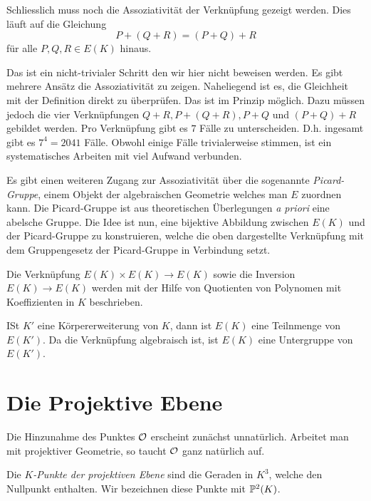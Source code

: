 Schliesslich muss noch die Assoziativität der Verknüpfung gezeigt
werden. Dies läuft auf die Gleichung
$$
P + (Q + R) = (P+Q)+R$$
für alle $P,Q,R\in E(K)$ hinaus.

Das ist ein nicht-trivialer Schritt den wir hier nicht beweisen
werden. Es gibt mehrere Ansätz die Assoziativität zu zeigen.
Naheliegend ist es, die Gleichheit mit der Definition direkt zu
überprüfen. Das ist im Prinzip möglich. Dazu müssen jedoch die vier
Verknüpfungen $Q+R, P+(Q+R), P+Q$ und $(P+Q)+R$ gebildet werden.
Pro Verknüpfung gibt es $7$ Fälle zu unterscheiden. D.h. ingesamt gibt
es $7^4= 2041$ Fälle. Obwohl einige Fälle trivialerweise stimmen, ist
ein systematisches Arbeiten mit viel Aufwand verbunden.


Es gibt einen weiteren Zugang zur Assoziativität über die sogenannte
 \emph{Picard-Gruppe}, einem  Objekt der algebraischen Geometrie
welches man $E$ zuordnen kann. Die Picard-Gruppe ist aus theoretischen
Überlegungen \textit{a priori} eine abelsche Gruppe. Die Idee ist nun, eine
bijektive Abbildung zwischen $E(K)$ und der Picard-Gruppe zu
konstruieren, welche die oben dargestellte Verknüpfung mit dem
Gruppengesetz der Picard-Gruppe in Verbindung setzt.


\begin{bemerkung}
  Die Verknüpfung $E(K)\times
  E(K)\rightarrow E(K)$ sowie die Inversion $E(K)\rightarrow E(K)$
  werden mit der Hilfe von 
  Quotienten von Polynomen mit Koeffizienten in $K$ beschrieben.

  ISt $K'$ eine Körpererweiterung von $K$, dann ist $E(K)$ eine
  Teilnmenge von $E(K')$. Da die Verknüpfung algebraisch ist, ist
  $E(K)$ eine Untergruppe von $E(K')$.
\end{bemerkung}

\section{Die Projektive Ebene}
\label{sec:projektiv}

Die Hinzunahme des Punktes ${\mathcal O}$ erscheint zunächst unnatürlich.
Arbeitet man mit projektiver Geometrie, so taucht ${\mathcal O}$ ganz natürlich
auf.

\begin{definition}
  Die \emph{$K$-Punkte der projektiven Ebene} sind die Geraden in $K^3$,
  welche den Nullpunkt enthalten. Wir bezeichnen diese Punkte mit
  ${\mathbb{P}}^2(K)$. 
\end{definition}

